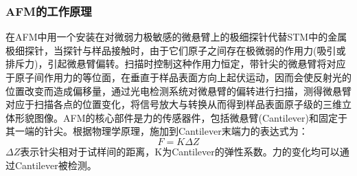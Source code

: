 \documentclass[a4paper]{article}
\begin{document}
\subsubsection{AFM的工作原理}
在AFM中用一个安装在对微弱力极敏感的微悬臂上的极细探针代替STM中的金属极细探针，当探针与样品接触时，由于它们原子之间存在极微弱的作用力(吸引或排斥力)，引起微悬臂偏转。扫描时控制这种作用力恒定，带针尖的微悬臂将对应于原子间作用力的等位面，在垂直于样品表面方向上起伏运动，因而会使反射光的位置改变而造成偏移量，通过光电检测系统对微悬臂的偏转进行扫描，测得微悬臂对应于扫描各点的位置变化，将信号放大与转换从而得到样品表面原子级的三维立体形貌图像。AFM的核心部件是力的传感器件，包括微悬臂(Cantilever)和固定于其一端的针尖。根据物理学原理，施加到Cantilever末端力的表达式为：
\begin{equation}
F = K\Delta Z\label{eq1}
\end{equation}
$\Delta Z$表示针尖相对于试样间的距离，K为Cantilever的弹性系数。力的变化均可以通过Cantilever被检测。
\end{document}
